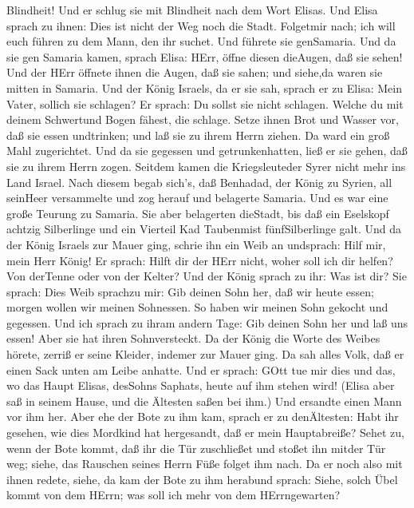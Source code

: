 Blindheit! Und er schlug sie mit Blindheit nach dem Wort Elisas.
 Und Elisa sprach zu ihnen: Dies ist nicht der Weg noch die
Stadt. Folgetmir nach; ich will euch führen zu dem Mann, den ihr suchet.
Und führete sie genSamaria.  Und da sie gen Samaria kamen,
sprach Elisa: HErr, öffne diesen dieAugen, daß sie sehen! Und der HErr
öffnete ihnen die Augen, daß sie sahen; und siehe,da waren sie mitten in
Samaria.  Und der König Israels, da er sie sah, sprach er
zu Elisa: Mein Vater, sollich sie schlagen?  Er sprach: Du
sollst sie nicht schlagen. Welche du mit deinem Schwertund Bogen fähest,
die schlage. Setze ihnen Brot und Wasser vor, daß sie essen undtrinken;
und laß sie zu ihrem Herrn ziehen.  Da ward ein groß Mahl
zugerichtet. Und da sie gegessen und getrunkenhatten, ließ er sie gehen,
daß sie zu ihrem Herrn zogen. Seitdem kamen die Kriegsleuteder Syrer
nicht mehr ins Land Israel.  Nach diesem begab sich's, daß
Benhadad, der König zu Syrien, all seinHeer versammelte und zog herauf
und belagerte Samaria.  Und es war eine große Teurung zu
Samaria. Sie aber belagerten dieStadt, bis daß ein Eselskopf achtzig
Silberlinge und ein Vierteil Kad Taubenmist fünfSilberlinge galt.
 Und da der König Israels zur Mauer ging, schrie ihn ein
Weib an undsprach: Hilf mir, mein Herr König!  Er sprach:
Hilft dir der HErr nicht, woher soll ich dir helfen? Von derTenne oder
von der Kelter?  Und der König sprach zu ihr: Was ist dir?
Sie sprach: Dies Weib sprachzu mir: Gib deinen Sohn her, daß wir heute
essen; morgen wollen wir meinen Sohnessen.  So haben wir
meinen Sohn gekocht und gegessen. Und ich sprach zu ihram andern Tage:
Gib deinen Sohn her und laß uns essen! Aber sie hat ihren Sohnversteckt.
 Da der König die Worte des Weibes hörete, zerriß er seine
Kleider, indemer zur Mauer ging. Da sah alles Volk, daß er einen Sack
unten am Leibe anhatte.  Und er sprach: GOtt tue mir dies
und das, wo das Haupt Elisas, desSohns Saphats, heute auf ihm stehen
wird!  (Elisa aber saß in seinem Hause, und die Ältesten
saßen bei ihm.) Und ersandte einen Mann vor ihm her. Aber ehe der Bote
zu ihm kam, sprach er zu denÄltesten: Habt ihr gesehen, wie dies
Mordkind hat hergesandt, daß er mein Hauptabreiße? Sehet zu, wenn der
Bote kommt, daß ihr die Tür zuschließet und stoßet ihn mitder Tür weg;
siehe, das Rauschen seines Herrn Füße folget ihm nach.  Da
er noch also mit ihnen redete, siehe, da kam der Bote zu ihm herabund
sprach: Siehe, solch Übel kommt von dem HErrn; was soll ich mehr von dem
HErrngewarten?


